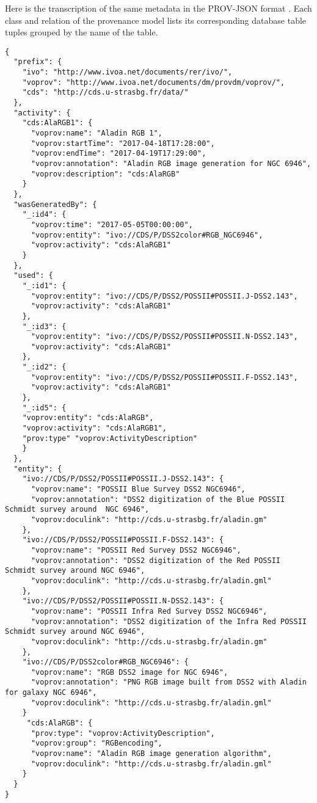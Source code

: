 Here is the transcription of the same metadata in the PROV-JSON format \citep{std:PROV-JSON}. 
Each class and relation of the provenance model lists its corresponding database table tuples grouped by the name of the table.

\begin{verbatim}
{
  "prefix": {
    "ivo": "http://www.ivoa.net/documents/rer/ivo/",
    "voprov": "http://www.ivoa.net/documents/dm/provdm/voprov/",
    "cds": "http://cds.u-strasbg.fr/data/"
  },
  "activity": {
    "cds:AlaRGB1": {
      "voprov:name": "Aladin RGB 1",
      "voprov:startTime": "2017-04-18T17:28:00",
	  "voprov:endTime": "2017-04-19T17:29:00",
      "voprov:annotation": "Aladin RGB image generation for NGC 6946",
      "voprov:description": "cds:AlaRGB"
    }
  },
  "wasGeneratedBy": {
    "_:id4": {
      "voprov:time": "2017-05-05T00:00:00",
      "voprov:entity": "ivo://CDS/P/DSS2color#RGB_NGC6946",
      "voprov:activity": "cds:AlaRGB1"
    }
  },
  "used": {
    "_:id1": {
      "voprov:entity": "ivo://CDS/P/DSS2/POSSII#POSSII.J-DSS2.143",
      "voprov:activity": "cds:AlaRGB1"
    },
    "_:id3": {
      "voprov:entity": "ivo://CDS/P/DSS2/POSSII#POSSII.N-DSS2.143",
      "voprov:activity": "cds:AlaRGB1"
    },
    "_:id2": {
      "voprov:entity": "ivo://CDS/P/DSS2/POSSII#POSSII.F-DSS2.143",
      "voprov:activity": "cds:AlaRGB1"
    },
    "_:id5": {
    "voprov:entity": "cds:AlaRGB",
    "voprov:activity": "cds:AlaRGB1",
    "prov:type" "voprov:ActivityDescription" 
    }
  },
  "entity": {
    "ivo://CDS/P/DSS2/POSSII#POSSII.J-DSS2.143": {
      "voprov:name": "POSSII Blue Survey DSS2 NGC6946",
      "voprov:annotation": "DSS2 digitization of the Blue POSSII Schmidt survey around  NGC 6946",
      "voprov:doculink": "http://cds.u-strasbg.fr/aladin.gm"
    },
    "ivo://CDS/P/DSS2/POSSII#POSSII.F-DSS2.143": {
      "voprov:name": "POSSII Red Survey DSS2 NGC6946",
      "voprov:annotation": "DSS2 digitization of the Red POSSII Schmidt survey around NGC 6946",
      "voprov:doculink": "http://cds.u-strasbg.fr/aladin.gml"
    },
    "ivo://CDS/P/DSS2/POSSII#POSSII.N-DSS2.143": {
      "voprov:name": "POSSII Infra Red Survey DSS2 NGC6946",
      "voprov:annotation": "DSS2 digitization of the Infra Red POSSII Schmidt survey around NGC 6946",
      "voprov:doculink": "http://cds.u-strasbg.fr/aladin.gm"
    },
    "ivo://CDS/P/DSS2color#RGB_NGC6946": {
      "voprov:name": "RGB DSS2 image for NGC 6946",
      "voprov:annotation": "PNG RGB image built from DSS2 with Aladin for galaxy NGC 6946",
      "voprov:doculink": "http://cds.u-strasbg.fr/aladin.gml"
    }
     "cds:AlaRGB": {
      "prov:type": "voprov:ActivityDescription",
      "voprov:group": "RGBencoding",
      "voprov:name": "Aladin RGB image generation algorithm",
      "voprov:doculink": "http://cds.u-strasbg.fr/aladin.gml"
    }
  }
}
\end{verbatim}

